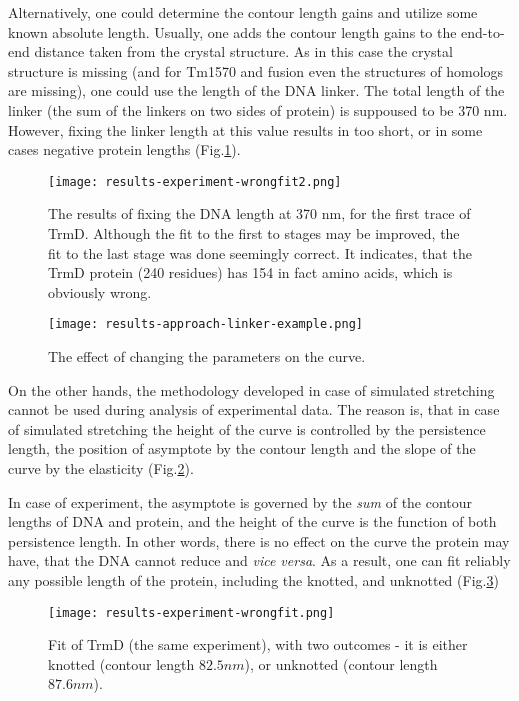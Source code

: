 Alternatively, one could determine the contour length gains and utilize some known absolute length.
Usually, one adds the contour length gains to the end-to-end distance taken from the crystal structure.
As in this case the crystal structure is missing (and for Tm1570 and fusion even the structures of homologs are missing), one could use the length of the DNA linker.
The total length of the linker (the sum of the linkers on two sides of protein) is suppoused to be 370 nm.
However, fixing the linker length at this value results in too short, or in some cases negative protein lengths (Fig.\ref{fig:results-approach-linker-wrongfit2}).

\begin{figure}
    \centering
    \texttt{[image: results-experiment-wrongfit2.png]}
    \caption{The results of fixing the DNA length at 370 nm, for the first trace of TrmD. Although the fit to the first to stages may be improved, the fit to the last stage was done seemingly correct. It indicates, that the TrmD protein (240 residues) has 154 in fact amino acids, which is obviously wrong.}
    \label{fig:results-approach-linker-wrongfit2}
\end{figure}

\begin{figure}
    \centering
    \texttt{[image: results-approach-linker-example.png]}
    \caption{The effect of changing the parameters on the curve.}
    \label{fig:results-approach-linker-example}
\end{figure}

On the other hands, the methodology developed in case of simulated stretching cannot be used during analysis of experimental data.
The reason is, that in case of simulated stretching the height of the curve is controlled by the persistence length, the position of asymptote by the contour length and the slope of the curve by the elasticity (Fig.\ref{fig:results-approach-linker-example}).

In case of experiment, the asymptote is governed by the \textit{sum} of the contour lengths of DNA and protein, and the height of the curve is the function of both persistence length.
In other words, there is no effect on the curve the protein may have, that the DNA cannot reduce and \textit{vice versa}.
As a result, one can fit reliably any possible length of the protein, including the knotted, and unknotted (Fig.\ref{fig:results-approach-linker-wrongfit})

\begin{figure}
    \centering
    \texttt{[image: results-experiment-wrongfit.png]}
    \caption{Fit of TrmD (the same experiment), with two outcomes - it is either knotted (contour length $82.5 nm$), or unknotted (contour length $87.6 nm$).}
    \label{fig:results-approach-linker-wrongfit}
\end{figure}

